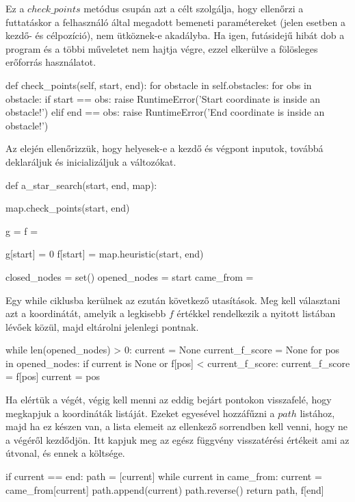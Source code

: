 
Ez a $ check\_points $ metódus csupán azt a célt szolgálja, hogy ellenőrzi a futtatáskor a felhasználó által megadott bemeneti paramétereket (jelen esetben a kezdő- és célpozíció), nem ütköznek-e akadályba. Ha igen, futásidejű hibát dob a program és a többi műveletet nem hajtja végre, ezzel elkerülve a fölösleges erőforrás használatot.
\begin{python}
	def check_points(self, start, end):
        for obstacle in self.obstacles:
            for obs in obstacle:
                if start == obs:
                    raise RuntimeError('Start coordinate is inside 
                    an obstacle!')
                elif end == obs:
                    raise RuntimeError('End coordinate is inside
                    an obstacle!')
\end{python}


Az elején ellenőrizzük, hogy helyesek-e a kezdő és végpont inputok, továbbá deklaráljuk és inicializáljuk a változókat.
\begin{python}
def a_star_search(start, end, map):

    map.check_points(start, end)

    g = {}  
    f = {}  

    g[start] = 0
    f[start] = map.heuristic(start, end)

    closed_nodes = set()
    opened_nodes = {start}
    came_from = {}
\end{python}

\bigskip

Egy while ciklusba kerülnek az ezután következő utasítások. Meg kell választani azt a koordinátát, amelyik a legkisebb $ f $ értékkel rendelkezik a nyitott listában lévőek közül, majd eltárolni jelenlegi pontnak. 
\begin{python}
	while len(opened_nodes) > 0:
        current = None
        current_f_score = None
        for pos in opened_nodes:
            if current is None or f[pos] < current_f_score:
                current_f_score = f[pos]
                current = pos

\end{python}

\bigskip

Ha elértük a végét, végig kell menni az eddig bejárt pontokon visszafelé, hogy megkapjuk a koordináták listáját. Ezeket egyesével hozzáfűzni a $ path $ listához, majd ha ez készen van, a lista elemeit az ellenkező sorrendben kell venni, hogy ne a végéről kezdődjön. Itt kapjuk meg az egész függvény visszatérési értékeit ami az útvonal, és ennek a költsége.
\begin{python}
	if current == end:
            path = [current]
            while current in came_from:
                current = came_from[current]
                path.append(current)
            path.reverse()
            return path, f[end]
\end{python}


